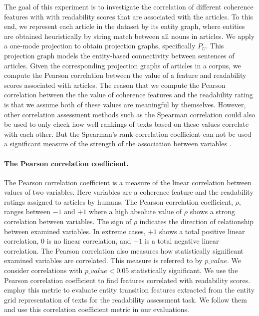 The goal of this experiment is to investigate the correlation of different coherence features with with readability scores that are associated  with the articles. 
To this end, we represent each article in the dataset by its entity graph, where entities are obtained heuristically by string match between all nouns in articles. 
We apply a one-mode projection to obtain projection graphs, specifically $P_U$. 
This projection graph models the entity-based connectivity between sentences of articles. 
Given the corresponding projection graphs of articles in a corpus, we compute the Pearson correlation between the value of a feature and readability scores associated with articles. 
The reason that we compute the Pearson correlation between the the value of coherence features and the readability rating is that we assume both of these values are meaningful by themselves. 
However, other correlation assessment methods such as the Spearman correlation could also be used to only check how well rankings of texts based on these values correlate with each other. 
But the Spearman's rank correlation coefficient can not be used a significant  measure of the strength of the association between variables \cite{hauke11}.

\paragraph{The Pearson correlation coefficient.} 
The Pearson correlation coefficient is a measure of the linear correlation between values of two variables. 
Here variables are a coherence feature and the readability ratings assigned to articles by humans. 
The Pearson correlation coefficient, $\rho$, ranges between $-1$ and $+1$ where a high absolute value of $\rho$ shows a strong correlation between variables. 
The sign of $\rho$ indicates the direction of relationship between examined variables. 
In extreme cases, $+1$ shows a total positive linear correlation, $0$ is no linear correlation, and $-1$ is a total negative linear correlation. 
The Pearson correlation also measures how statistically significant examined variables are correlated. 
This measure is referred to by $p\_value$. 
We consider correlations with $p\_value < 0.05$ statistically significant. 
We use the Pearson correlation coefficient to find features correlated with readability scores. 
 employ this metric to evaluate entity transition features extracted from the entity grid representation \cite{barzilay08} of texts for the readability assessment task. 
We follow them and use this correlation coefficient metric in our evaluations. 


